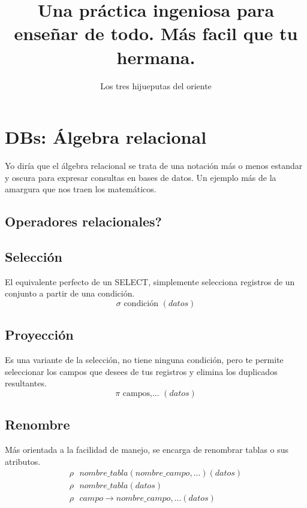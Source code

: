 \documentclass{article}
\title{Una práctica ingeniosa para enseñar de todo. Más facil que tu hermana.}
\author{Los tres hijueputas del oriente}
\begin{document}
	
	
	{\centering \section*{DBs: Álgebra relacional}}
	
	Yo diría que el álgebra relacional se trata de una notación más o menos estandar y oscura para expresar consultas en bases de datos. Un ejemplo más de la amargura que nos traen los matemáticos.
	
	\setcounter{section}{0}
	
	\begin{multicols}{2}
		\section{Operadores relacionales?}
		
		\subsection{Selección}
		
		El equivalente perfecto de un SELECT, simplemente selecciona registros de un conjunto a partir de una condición.
		\[
		\sigma \text{ condición } ( datos )
		\]

		\subsection{Proyección}
		
		Es una variante de la selección, no tiene ninguna condición, pero te permite seleccionar los campos que desees de tus registros y elimina los duplicados resultantes.
		\[
		\pi \text{ campos,... } ( datos )
		\]
		
		\subsection{Renombre}
		
		Más orientada a la facilidad de manejo, se encarga de renombrar tablas o sus atributos.
		\[
		\begin{array}{c}
			\rho \text{ } nombre\_tabla( nombre\_campo,... ) (datos) \\
			\rho \text{ } nombre\_tabla (datos) \\
			\rho \text{ } campo \rightarrow nombre\_campo,... (datos)
		\end{array}
		\]
		

\end{multicols}
\end{document}
